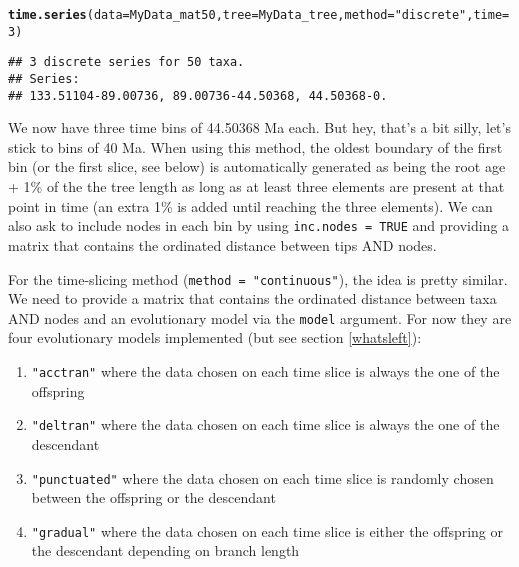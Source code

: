 \documentclass{article}\usepackage[]{graphicx}\usepackage[]{color}
\makeatletter
\newcommand{\hlnum}[1]{\textcolor[rgb]{0.686,0.059,0.569}{#1}}%
\newcommand{\hlstr}[1]{\textcolor[rgb]{0.192,0.494,0.8}{#1}}%
\newcommand{\hlstd}[1]{\textcolor[rgb]{0.345,0.345,0.345}{#1}}%
\newcommand{\hlkwc}[1]{\textcolor[rgb]{0.333,0.667,0.333}{#1}}%
\newcommand{\hlkwd}[1]{\textcolor[rgb]{0.737,0.353,0.396}{\textbf{#1}}}%
\newenvironment{kframe}{%
 \def\at@end@of@kframe{}%
 \ifinner\ifhmode%
  \def\at@end@of@kframe{\end{minipage}}%
  \begin{minipage}{\columnwidth}%
 \fi\fi%
 \def\FrameCommand##1{\hskip\@totalleftmargin \hskip-\fboxsep
 \colorbox{shadecolor}{##1}\hskip-\fboxsep
     \hskip-\linewidth \hskip-\@totalleftmargin \hskip\columnwidth}%
 \MakeFramed {\advance\hsize-\width
   \@totalleftmargin\z@ \linewidth\hsize
   \@setminipage}}%
 {\par\unskip\endMakeFramed%
 \at@end@of@kframe}
\newenvironment{knitrout}{}{} %
\makeatother
\begin{document}
\begin{knitrout}
\color{fgcolor}\begin{kframe}
\begin{alltt}
\hlkwd{time.series}\hlstd{(}\hlkwc{data} \hlstd{= MyData_mat50,} \hlkwc{tree} \hlstd{= MyData_tree,} \hlkwc{method} \hlstd{=} \hlstr{"discrete"}\hlstd{,} \hlkwc{time} \hlstd{=} \hlnum{3}\hlstd{)}
\end{alltt}


{\ttfamily\noindent\itshape\color{messagecolor}{\#\# No FADLAD table has been provided so every tip is assumed to interval single points in time.}}\begin{verbatim}
## 3 discrete series for 50 taxa. 
## Series:
## 133.51104-89.00736, 89.00736-44.50368, 44.50368-0.
\end{verbatim}
\end{kframe}
\end{knitrout}

We now have three time bins of 44.50368 Ma each. But hey, that's a bit silly, let's stick to bins of 40 Ma.
When using this method, the oldest boundary of the first bin (or the first slice, see below) is automatically generated as being the root age + 1\% of the the tree length as long as at least three elements are present at that point in time (an extra 1\% is added until reaching the three elements).
We can also ask to include nodes in each bin by using \texttt{inc.nodes = TRUE} and providing a matrix that contains the ordinated distance between tips AND nodes.

For the time-slicing method (\texttt{method = "continuous"}), the idea is pretty similar.
We need to provide a matrix that contains the ordinated distance between taxa AND nodes and an evolutionary model via the \texttt{model} argument.
For now they are four evolutionary models implemented \cite{GuillermeSTD} (but see section \ref{whatsleft}):
\begin{enumerate}
\item \texttt{"acctran"} where the data chosen on each time slice is always the one of the offspring
\item \texttt{"deltran"} where the data chosen on each time slice is always the one of the descendant
\item \texttt{"punctuated"} where the data chosen on each time slice is randomly chosen between the offspring or the descendant
\item \texttt{"gradual"} where the data chosen on each time slice is either the offspring or the descendant depending on branch length
\end{enumerate}
\end{document}
